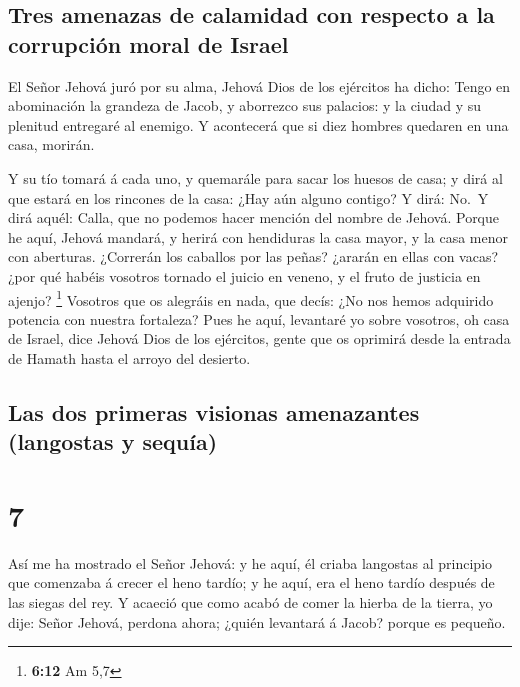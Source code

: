 \hypertarget{tres-amenazas-de-calamidad-con-respecto-a-la-corrupciuxf3n-moral-de-israel}{%
\subsection{Tres amenazas de calamidad con respecto a la corrupción
moral de
Israel}\label{tres-amenazas-de-calamidad-con-respecto-a-la-corrupciuxf3n-moral-de-israel}}

 El Señor Jehová juró por su alma, Jehová Dios de los
ejércitos ha dicho: Tengo en abominación la grandeza de Jacob, y
aborrezco sus palacios: y la ciudad y su plenitud entregaré al enemigo.
 Y acontecerá que si diez hombres quedaren en una casa,
morirán.

 Y su tío tomará á cada uno, y quemarále para sacar los
huesos de casa; y dirá al que estará en los rincones de la casa: ¿Hay
aún alguno contigo? Y dirá: No.~Y dirá aquél: Calla, que no podemos
hacer mención del nombre de Jehová.  Porque he aquí,
Jehová mandará, y herirá con hendiduras la casa mayor, y la casa menor
con aberturas.  ¿Correrán los caballos por las peñas?
¿ararán en ellas con vacas? ¿por qué habéis vosotros tornado el juicio
en veneno, y el fruto de justicia en ajenjo? \footnote{\textbf{6:12} Am
  5,7}  Vosotros que os alegráis en nada, que decís: ¿No
nos hemos adquirido potencia con nuestra fortaleza?  Pues
he aquí, levantaré yo sobre vosotros, oh casa de Israel, dice Jehová
Dios de los ejércitos, gente que os oprimirá desde la entrada de Hamath
hasta el arroyo del desierto.

\hypertarget{las-dos-primeras-visionas-amenazantes-langostas-y-sequuxeda}{%
\subsection{Las dos primeras visionas amenazantes (langostas y
sequía)}\label{las-dos-primeras-visionas-amenazantes-langostas-y-sequuxeda}}

\hypertarget{section-6}{%
\section{7}\label{section-6}}

 Así me ha mostrado el Señor Jehová: y he aquí, él criaba
langostas al principio que comenzaba á crecer el heno tardío; y he aquí,
era el heno tardío después de las siegas del rey.  Y
acaeció que como acabó de comer la hierba de la tierra, yo dije: Señor
Jehová, perdona ahora; ¿quién levantará á Jacob? porque es pequeño.

